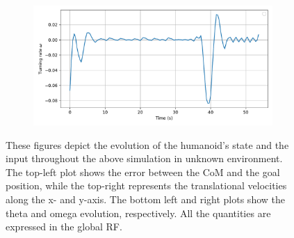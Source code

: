 \begin{figure}[H]
\begin{subfigure}{0.45\linewidth}
    \end{subfigure}
    \begin{subfigure}{0.45\linewidth}
        \centering
        \includegraphics[width=\linewidth]{figures/Simulations/sim2unkenv/evolution_3.pdf}
    \end{subfigure}
    \caption{These figures depict the evolution of the humanoid's state and the input throughout the above simulation in unknown environment. The top-left plot shows the error between the CoM and the goal position, while the top-right represents the translational velocities along the x- and y-axis. The bottom left and right plots show the theta and omega evolution, respectively. All the quantities are expressed in the global RF.}
    \label{fig:unk_env_evol}
\end{figure}